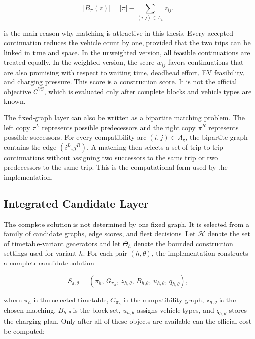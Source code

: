 \begin{equation}
|B_\pi(z)|
=
|\pi|-\sum_{(i,j)\in A_\pi} z_{ij}.
\label{eq:block-number-from-continuations}
\end{equation}

 is the main reason why matching is
attractive in this thesis.  Every accepted continuation reduces the vehicle
count by one, provided that the two trips can be linked in time and space.  In
the unweighted version, all feasible continuations are treated equally.  In the
weighted version, the score \(w_{ij}\) favors continuations that are also
promising with respect to waiting time, deadhead effort, EV feasibility, and
charging pressure.  This score is a construction score.  It is not the official
objective \(C^{VS}\), which is evaluated only after complete blocks and vehicle
types are known.

The fixed-graph layer can also be written as a bipartite matching problem.  The
left copy \(\pi^L\) represents possible predecessors and the right copy
\(\pi^R\) represents possible successors.  For every compatibility arc
\((i,j)\in A_\pi\), the bipartite graph contains the edge \((i^L,j^R)\).  A
matching then selects a set of trip-to-trip continuations without assigning two
successors to the same trip or two predecessors to the same trip.  This is the
computational form used by the implementation.

\subsection{Integrated Candidate Layer}
\label{subsec:integrated-candidate-layer}

The complete solution is not determined by one fixed graph.  It is selected
from a family of candidate graphs, edge scores, and fleet decisions.  Let
\(\mathcal{H}\) denote the set of timetable-variant generators and let
\(\Theta_h\) denote the bounded construction settings used for variant \(h\).
For each pair \((h,\theta)\), the implementation constructs a complete
candidate solution

\begin{equation}
S_{h,\theta}
=
\left(
\pi_h,\,
G_{\pi_h},\,
z_{h,\theta},\,
B_{h,\theta},\,
u_{h,\theta},\,
q_{h,\theta}
\right),
\label{eq:complete-candidate-tuple}
\end{equation}

where \(\pi_h\) is the selected timetable, \(G_{\pi_h}\) is the compatibility
graph, \(z_{h,\theta}\) is the chosen matching, \(B_{h,\theta}\) is the block
set, \(u_{h,\theta}\) assigns vehicle types, and \(q_{h,\theta}\) stores the
charging plan.  Only after all of these objects are available can the official
cost be computed:

